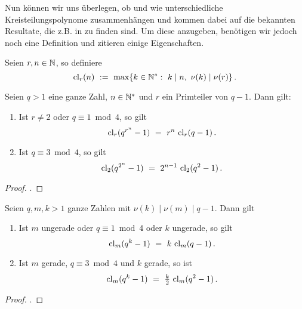 Nun können wir uns überlegen, ob und wie unterschiedliche Kreisteilungspolynome
zusammenhängen und kommen dabei auf die bekannten Resultate, die z.B. in 
\autocite[Proposition 10.6, 10.7]{hachenberger1997finite} zu finden sind. Um
diese anzugeben, benötigen wir jedoch noch eine Definition und zitieren
einige Eigenschaften.

\begin{definition}
  \label{def:closure}
  Seien $r,n\in \mathbb{N}$, so definiere
  \[ \operatorname{cl}_r(n) \ :=\  \max\{k \in \mathbb{N}^\ast:\ k \mid n,\ \nu(k) \mid \nu(r)
  \}\,.\]
\end{definition}


\begin{lemma}
  \label{lemma:cl_1}
  Seien $q>1$ eine ganze Zahl, $n\in \mathbb{N}^\ast$ und $r$ ein Primteiler von $q-1$.
  Dann gilt:
  \begin{enumerate}
    \item Ist $r\neq 2$ oder $q\equiv 1 \bmod 4$, so gilt
      \[ \operatorname{cl}_r(q^{r^n}-1) \ =\  r^n\, \operatorname{cl}_r(q-1) \,.\]
    \item Ist $q \equiv 3 \bmod 4$, so gilt
      \[ \operatorname{cl}_2(q^{2^n}-1) \ =\  2^{n-1}\, \operatorname{cl}_2(q^2-1)\,.\]
  \end{enumerate}
\end{lemma}
\begin{proof}
  \autocite[Lemma 19.4]{hachenberger1997finite}.
\end{proof}


\begin{lemma}
  \label{lemma:cl_2}
  Seien $q,m,k > 1$ ganze Zahlen mit $\nu(k) \mid \nu(m)\mid q-1$. Dann gilt
  \begin{enumerate}
    \item Ist $m$ ungerade oder $q \equiv 1 \bmod 4$ oder $k$ ungerade, so
      gilt
      \[ \operatorname{cl}_m(q^k-1) \ =\  k\,\operatorname{cl}_m(q-1)\,. \]
    \item Ist $m$ gerade, $q \equiv 3 \bmod 4$ und $k$ gerade, so ist
      \[ \operatorname{cl}_m(q^k-1) \ =\  \tfrac k 2\, \operatorname{cl}_m(q^2-1)\,.\]
  \end{enumerate}
\end{lemma}
\begin{proof}
  \autocite[Lemma 19.5]{hachenberger1997finite}.
\end{proof}


